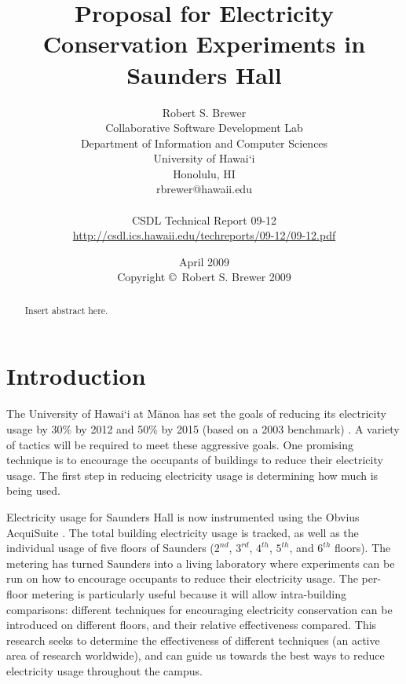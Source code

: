 \documentclass[11pt]{article}
\begin{document}
\title{Proposal for Electricity Conservation Experiments in Saunders Hall}
\author{Robert S. Brewer \\
Collaborative Software Development Lab \\
Department of Information and Computer Sciences \\
University of Hawai`i \\
Honolulu, HI \\
rbrewer@hawaii.edu \\
\\
CSDL Technical Report 09-12 \\
\url{http://csdl.ics.hawaii.edu/techreports/09-12/09-12.pdf}
}
\date{April 2009\\[3pt]
Copyright \copyright\ Robert S. Brewer 2009}

\maketitle


\begin{abstract}
Insert abstract here.
\end{abstract}

\section{Introduction}

The University of Hawai`i at M\=anoa has set the goals of reducing its electricity usage by 30\% by 2012 and 50\% by 2015 (based on a 2003 benchmark) \cite{Moreno2006UHM-energy-goals, 2007UHM-HECO-pr}. A variety of tactics will be required to meet these aggressive goals. One promising technique is to encourage the occupants of buildings to reduce their electricity usage. The first step in reducing electricity usage is determining how much is being used.

Electricity usage for Saunders Hall is now instrumented using the Obvius AcquiSuite \cite{ObviusAcquiSuite}. The total building electricity usage is tracked, as well as the individual usage of five floors of Saunders ($2^{nd}$, $3^{rd}$, $4^{th}$, $5^{th}$, and $6^{th}$ floors). The metering has turned Saunders into a living laboratory where experiments can be run on how to encourage occupants to reduce their electricity usage. The per-floor metering is particularly useful because it will allow intra-building comparisons: different techniques for encouraging electricity conservation can be introduced on different floors, and their relative effectiveness compared. This research seeks to determine the effectiveness of different techniques (an active area of research worldwide), and can guide us towards the best ways to reduce electricity usage throughout the campus.
\end{document}
